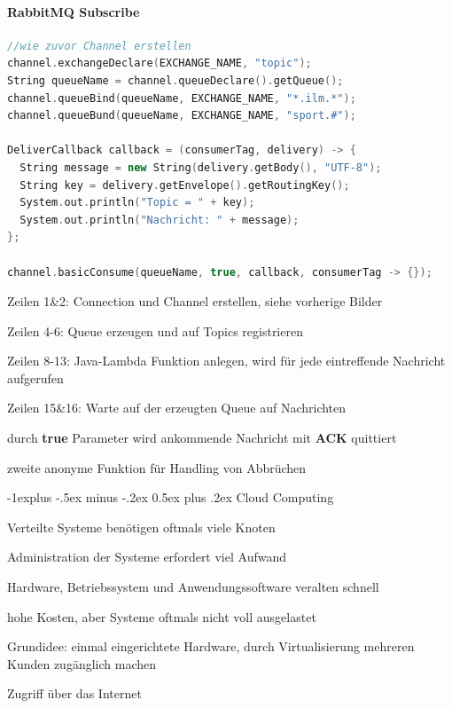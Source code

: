 \documentclass[10pt]{article}
\makeatletter
\renewcommand{\subsection}{\@startsection{subsection}{2}{0mm}%
                                {-1explus -.5ex minus -.2ex}%
                                {0.5ex plus .2ex}%
                                {\normalfont\normalsize\bfseries}}
\makeatother
\begin{document}
\paragraph{RabbitMQ Subscribe}
\begin{lstlisting}[language=C++]
//wie zuvor Channel erstellen
channel.exchangeDeclare(EXCHANGE_NAME, "topic");
String queueName = channel.queueDeclare().getQueue();
channel.queueBind(queueName, EXCHANGE_NAME, "*.ilm.*");
channel.queueBund(queueName, EXCHANGE_NAME, "sport.#");

DeliverCallback callback = (consumerTag, delivery) -> {
  String message = new String(delivery.getBody(), "UTF-8");
  String key = delivery.getEnvelope().getRoutingKey();
  System.out.println("Topic = " + key);
  System.out.println("Nachricht: " + message);
};

channel.basicConsume(queueName, true, callback, consumerTag -> {});
\end{lstlisting}
\begin{itemize*}
  \item Zeilen 1\&2: Connection und Channel erstellen, siehe vorherige Bilder
  \item Zeilen 4-6: Queue erzeugen und auf Topics registrieren
  \item Zeilen 8-13: Java-Lambda Funktion anlegen, wird für jede eintreffende Nachricht aufgerufen
  \item Zeilen 15\&16: Warte auf der erzeugten Queue auf Nachrichten
  \begin{itemize*}
    \item durch \textbf{true} Parameter wird ankommende Nachricht mit \textbf{ACK} quittiert
    \item zweite anonyme Funktion für Handling von Abbrüchen
  \end{itemize*}
\end{itemize*}

\subsection{Cloud Computing}
\begin{itemize*}
  \item Verteilte Systeme benötigen oftmals viele Knoten
  \item Administration der Systeme erfordert viel Aufwand
  \item Hardware, Betriebssystem und Anwendungssoftware veralten schnell
  \item hohe Kosten, aber Systeme oftmals nicht voll ausgelastet
  \item Grundidee: einmal eingerichtete Hardware, durch Virtualisierung mehreren Kunden zugänglich machen
  \item Zugriff über das Internet
\end{itemize*}
\end{document}
